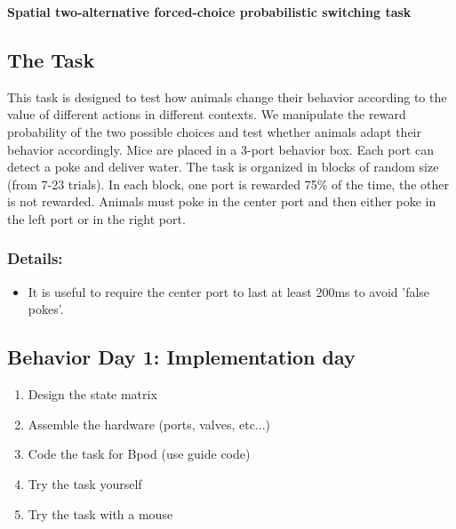 \documentclass[a4paper]{report}
\begin{document}

\setcounter{secnumdepth}{2}

\begin{center}
\textbf{\Large{Spatial two-alternative forced-choice probabilistic switching task}}
\end{center}



\subsection*{The Task}

This task is designed to test how animals change their behavior according to the value of different actions in different contexts. We manipulate the reward probability of the two possible choices and test whether animals adapt their behavior accordingly.
Mice are placed in a 3-port behavior box. Each port can detect a poke and deliver water. The task is organized in blocks of random size (from 7-23 trials). In each block, one port is rewarded 75\% of the time, the other is not rewarded. Animals must poke in the center port and then either poke in the left port or in the right port.

\subsubsection{Details:} 
\begin{itemize}
\item It is useful to require the center port to last at least 200ms to avoid 'false pokes'.
\end{itemize}


\subsection*{Behavior Day 1: Implementation day}

\begin{enumerate}
\item Design the state matrix
\item Assemble the hardware (ports, valves, etc...)
\item Code the task for Bpod (use guide code)
\item Try the task yourself
\item Try the task with a mouse
\end{enumerate}
\end{document}
